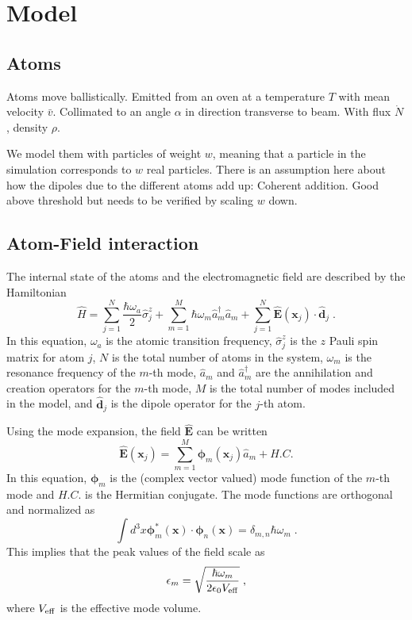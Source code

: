 \documentclass[aps, superscriptaddress, groupedaddress, preprint]{revtex4}
\renewcommand\vec{\mathbf}
\begin{document}
\tableofcontents

\section{Model}


\subsection{Atoms}

Atoms move ballistically.  Emitted from an oven at a temperature
$T$ with mean velocity $\bar{v}$.  Collimated to an angle
$\alpha$ in direction transverse to beam.  With flux $\dot N$,
density $\rho$.

We model them with particles of weight $w$, meaning that a
particle in the simulation corresponds to $w$ real particles.
There is an assumption here about how the dipoles due to the
different atoms add up: Coherent addition.  Good above threshold
but needs to be verified by scaling $w$ down.


\subsection{Atom-Field interaction}

The internal state of the atoms and the electromagnetic field are
described  by the Hamiltonian
\begin{equation}
  \hat H =
  \sum_{j=1}^N \frac{\hbar \omega_a}{2}\hat \sigma_j^z +
  \sum_{m=1}^M \hbar\omega_m\hat a_m^\dagger\hat a_m +
  \sum_{j=1}^N \vec{\hat E}(\vec{x}_j)\cdot \vec{\hat d}_j\;.
  \label{eqn:Hamiltonian}
\end{equation}
In this equation, $\omega_a$ is the atomic transition frequency,
$\hat\sigma_j^z$ is the $z$ Pauli spin matrix for atom $j$, $N$
is the total number of atoms in the system, $\omega_m$ is the
resonance frequency of the $m$-th mode, $\hat a_m$ and $\hat
a_m^\dagger$ are the annihilation and creation operators for the
$m$-th mode, $M$ is the total number of modes included in the
model, and $\vec{\hat{d}}_j$ is the dipole operator for the $j$-th
atom.

Using the mode expansion, the field $\vec{\hat E}$ can be written
\begin{equation}
  \vec{\hat E}(\vec{x}_j) =
  \sum_{m=1}^M\vec{\phi}_m(\vec{x}_j) \hat a_m + H.C.
\end{equation}
In this equation, $\vec{\phi}_m$ is the (complex vector valued)
mode function of the $m$-th mode and $H.C.$ is the Hermitian
conjugate.  The mode functions are orthogonal and normalized as
\begin{equation}
  \int d^3x \vec{\phi}_m^*(\vec{x})\cdot\vec{\phi}_n(\vec{x}) =
  \delta_{m,n}\hbar\omega_m\;.
\end{equation}
This implies that the peak values of the field scale as
\begin{equation}
  \epsilon_m = \sqrt{\frac{\hbar\omega_m}{2\epsilon_0V_{\rm eff}}}\;,
\end{equation}
where $V_{\rm eff}$ is the effective mode volume.
\end{document}

